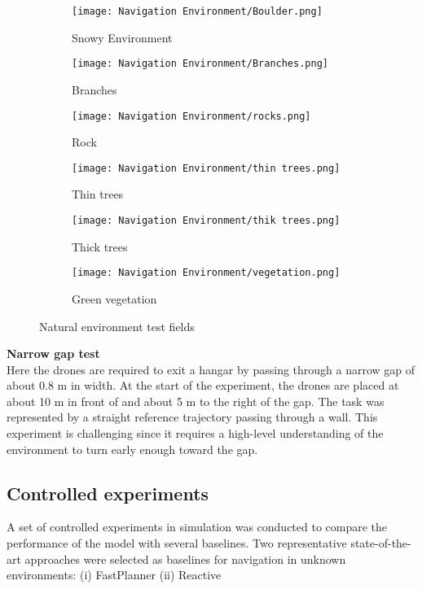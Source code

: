 \begin{figure}[!h]
	\centering
	\begin{subfigure}[b]{0.29\textwidth}
		\centering
		\texttt{[image: Navigation Environment/Boulder.png]}
		\caption{Snowy Environment}
	\end{subfigure}
	\hfill
	\begin{subfigure}[b]{0.29\textwidth}
		\centering
		\texttt{[image: Navigation Environment/Branches.png]}
		\caption{Branches}
	\end{subfigure}
	\hfill	
	\begin{subfigure}[b]{0.29\textwidth}
		\centering
		\texttt{[image: Navigation Environment/rocks.png]}
		\caption{Rock}
	\end{subfigure}
	\hfill
	\begin{subfigure}[b]{0.29\textwidth}
		\centering
		\texttt{[image: Navigation Environment/thin trees.png]}
		\caption{Thin trees}
	\end{subfigure}
	\hfill
	\begin{subfigure}[b]{0.29\textwidth}
		\centering
		\texttt{[image: Navigation Environment/thik trees.png]}
		\caption{Thick trees}
	\end{subfigure}
	\hfill
	\begin{subfigure}[b]{0.29\textwidth}
		\centering
		\texttt{[image: Navigation Environment/vegetation.png]}
		\caption{Green vegetation}
	\end{subfigure}
	
	\caption{Natural environment test fields}
	\label{fig:natural envt}
\end{figure}

\textbf{Narrow gap test}\\
Here the drones are required to exit a hangar by passing through a narrow gap of about 0.8 m in width. At the start of the experiment, the drones are placed at about 10 m in front of and about 5 m to the right of the gap. The task was represented by a straight reference trajectory passing through a wall. This experiment is challenging since it requires a high-level understanding of the environment to turn early enough toward the gap. 

\subsection{Controlled experiments}
A set of controlled experiments in simulation was conducted to compare the performance of the model with several baselines. Two representative state-of-the-art approaches were selected as baselines for navigation in unknown environments: (i) FastPlanner \cite{fastPlanner} (ii) Reactive \cite{reactive_method}

